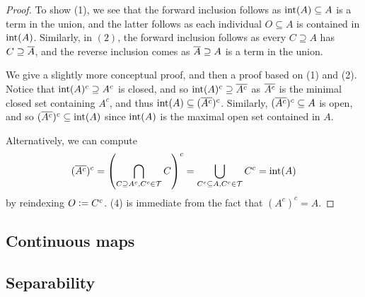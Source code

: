 \documentclass[11pt]{article}
\begin{document}
\begin{proof}
    To show (1), we see that the forward inclusion follows as $\operatorname{int}(A) \subseteq A$ is a term in the union, and the latter follows as each individual $O \subseteq A$ is contained in $\operatorname{int}(A)$. Similarly, in $(2)$, the forward inclusion follows as every $C \supseteq A$ has $C \supseteq \overline{A}$, and the reverse inclusion comes as $\overline{A} \supseteq A$ is a term in the union.

    We give a slightly more conceptual proof, and then a proof based on (1) and (2). Notice that $\operatorname{int}(A)^c \supseteq A^c$ is closed, and so $\operatorname{int}(A)^c \supseteq \overline{A^c}$ as $\overline{A^c}$ is the minimal closed set containing $A^c$, and thus $\operatorname{int}(A) \subseteq (\overline{A^c})^c$. Similarly, $(\overline{A^c})^c \subseteq A$ is open, and so $(\overline{A^c})^c \subseteq \operatorname{int}(A)$ since $\operatorname{int}(A)$ is the maximal open set contained in $A$.

    Alternatively, we can compute
    $$
        (\overline{A^c})^c = \left(  \bigcap_{C \supseteq A^c, C^c \in \mathcal{T}} C  \right)^c = \bigcup_{C^c \subseteq A, C^c \in \mathcal{T}}C^c = \operatorname{int}(A)
    $$
    by reindexing $O \vcentcolon= C^c$. (4) is immediate from the fact that $(A^c)^c = A$.
\end{proof}







\subsection{Continuous maps}







\subsection{Separability}
\end{document}
